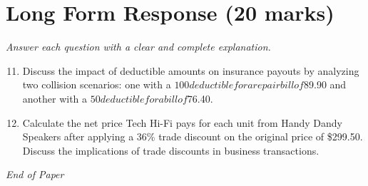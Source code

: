 \documentclass[12pt]{article}
\begin{document}
\section*{Long Form Response (20 marks)}
\textit{Answer each question with a clear and complete explanation.}
\begin{enumerate}[label=\arabic*.]
\setcounter{enumi}{10}
\item Discuss the impact of deductible amounts on insurance payouts by analyzing two collision scenarios: one with a $100 deductible for a repair bill of $89.90 and another with a $50 deductible for a bill of $76.40.
\item Calculate the net price Tech Hi-Fi pays for each unit from Handy Dandy Speakers after applying a 36\% trade discount on the original price of \$299.50. Discuss the implications of trade discounts in business transactions.
\end{enumerate}

\vfill
\noindent\textit{End of Paper}
\end{document}
